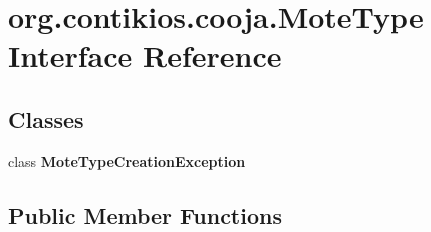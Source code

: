\hypertarget{interfaceorg_1_1contikios_1_1cooja_1_1MoteType}{\section{org.\-contikios.\-cooja.\-Mote\-Type Interface Reference}
\label{interfaceorg_1_1contikios_1_1cooja_1_1MoteType}
}
\subsection*{Classes}
\begin{DoxyCompactItemize}
\item 
class {\bfseries Mote\-Type\-Creation\-Exception}
\end{DoxyCompactItemize}
\subsection*{Public Member Functions}

